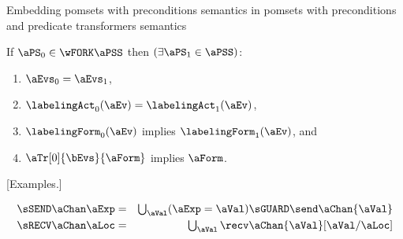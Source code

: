 Embedding pomsets with preconditions semantics in pomsets with preconditions and predicate transformers semantics  
\begin{definition}
  If $\aPS_0 \in \wFORK\aPSS$ then
  $(\exists\aPS_1\in\aPSS)$:
  \begin{enumerate}
  \item $\aEvs_0=\aEvs_1$,
  \item $\labelingAct_0(\aEv) = \labelingAct_1(\aEv)$,
  \item $\labelingForm_0(\aEv)$ implies $\labelingForm_1(\aEv)$, and
  \item $\aTr[0]{\bEvs}{\aForm}$ implies $\aForm$.
  \end{enumerate}
\end{definition}

[Examples.]

\begin{eqnarray*}
  \sSEND\aChan\aExp & = &
  \textstyle\bigcup_\aVal (\aExp=\aVal) \sGUARD \send\aChan{\aVal}
\\
  \sRECV\aChan\aLoc & = &
  \textstyle\bigcup_\aVal \recv\aChan{\aVal}[\aVal/\aLoc]
\end{eqnarray*}

